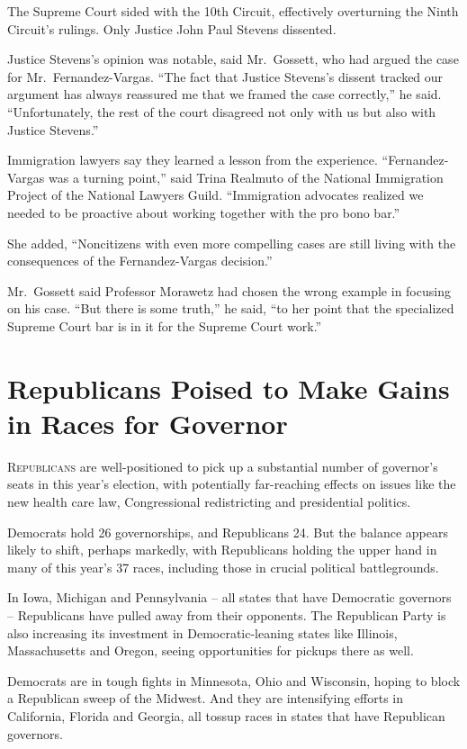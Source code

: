 ﻿\documentclass[12pt]{article}
\begin{document}
The Supreme Court sided with the 10th Circuit, effectively overturning the Ninth Circuit's rulings.
Only Justice John Paul Stevens dissented.

Justice Stevens's opinion was notable, said Mr.~Gossett, who had argued the case for
Mr.~Fernandez-Vargas. ``The fact that Justice Stevens's dissent tracked our argument has always
reassured me that we framed the case correctly,'' he said. ``Unfortunately, the rest of the court
disagreed not only with us but also with Justice Stevens.''

Immigration lawyers say they learned a lesson from the experience. ``Fernandez-Vargas was a turning
point,'' said Trina Realmuto of the National Immigration Project of the National Lawyers Guild.
``Immigration advocates realized we needed to be proactive about working together with the pro bono
bar.''

She added, ``Noncitizens with even more compelling cases are still living with the consequences of
the Fernandez-Vargas decision.''

Mr.~Gossett said Professor Morawetz had chosen the wrong example in focusing on his case. ``But
there is some truth,'' he said, ``to her point that the specialized Supreme Court bar is in it for
the Supreme Court work.''

\section{Republicans Poised to Make Gains in Races for Governor}

\lettrine{R}{epublicans} are well-positioned to pick up a substantial number
of governor's seats in this year's election, with potentially far-reaching effects on issues like
the new health care law, Congressional redistricting and presidential politics.

Democrats hold 26 governorships, and Republicans 24. But the balance appears likely to shift,
perhaps markedly, with Republicans holding the upper hand in many of this year's 37 races, including
those in crucial political battlegrounds.

In Iowa, Michigan and Pennsylvania -- all states that have Democratic governors -- Republicans have
pulled away from their opponents. The Republican Party is also increasing its investment in
Democratic-leaning states like Illinois, Massachusetts and Oregon, seeing opportunities for pickups
there as well.

Democrats are in tough fights in Minnesota, Ohio and Wisconsin, hoping to block a Republican sweep
of the Midwest. And they are intensifying efforts in California, Florida and Georgia, all tossup
races in states that have Republican governors.
\end{document}
